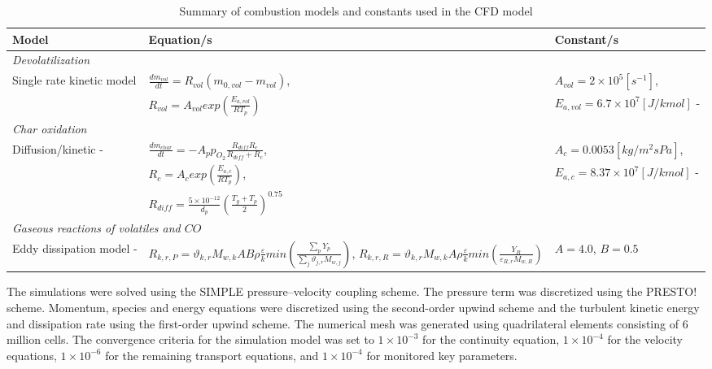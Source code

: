 \documentclass[a4paper,fleqn]{cas-dc}
\begin{document}
\begin{table}[h!]
\caption{Summary of combustion models and constants used in the CFD model}\label{tbl_combust}
\begin{tabular*}{\tblwidth}{p{}p{}p{}}
\toprule
Model & Equation/s & Constant/s\\
\midrule
\multicolumn{3}{l}{\textit{Devolatilization}} \\ %
Single rate kinetic model &$\frac{dm_{vol}}{dt} = R_{vol}(m_{0,vol}-m_{vol})$,  & $A_{vol} = 2\times10^5 [s^{-1}]$, \\
& $R_{vol} = A_{vol}exp\left(\frac{E_{a,vol}}{RT_p}\right)$ & $ E_{a,vol} = 6.7\times10^7 [J/kmol]$ - \cite{Sheng2004} \\
\multicolumn{3}{l}{\textit{Char oxidation}} \\
Diffusion/kinetic - \citep{Baum1971} & $\frac{dm_{char}}{dt} = -A_p p_{O_{2}} \frac{R_{diff}R_c}{R_{diff} + R_c}$,  & $A_{c} = 0.0053 [kg/m^2sPa]$, \\
& $R_{c} = A_{c}exp\left(\frac{E_{a,c}}{RT_p}\right)$,  & $E_{a,c} = 8.37\times10^7 [J/kmol]$ - \cite{Sheng2004} \\
& $R_{diff} = \frac{5\times10^{-12}}{d_p} \left(\frac{T_g+T_p}{2}\right)^{0.75}$&\\
\multicolumn{3}{l}{\textit{Gaseous reactions of volatiles and $CO$}} \\
Eddy dissipation model - \cite{Ansys} & $R_{k,r,P} =\vartheta_{k,r}M_{w,k}AB\rho\frac{\varepsilon}{k}min\left(\frac{\sum_{p} Y_p}{\sum_{j}\vartheta_{j,r}M_{w,j}}\right)$, $R_{k,r,R} =\vartheta_{k,r}M_{w,k}A\rho\frac{\varepsilon}{k}min\left(\frac{Y_R}{\varepsilon_{R,r}M_{w,R}}\right)$ & $A=4.0$, $B=0.5$\\
\bottomrule
\end{tabular*}
\end{table}

The simulations were solved using the SIMPLE pressure–velocity coupling scheme. The pressure term was discretized using the PRESTO! scheme. Momentum, species and energy equations were discretized using the second-order upwind scheme and the turbulent kinetic energy and dissipation rate using the first-order upwind scheme. The numerical mesh was generated using quadrilateral elements consisting of 6 million cells.  The convergence criteria for the simulation model was set to $1\times10^{-3}$ for the continuity equation, $1\times10^{-4}$ for the velocity equations, $1\times10^{-6}$ for the remaining transport equations, and $1\times10^{-4}$ for monitored key parameters.
\end{document}
